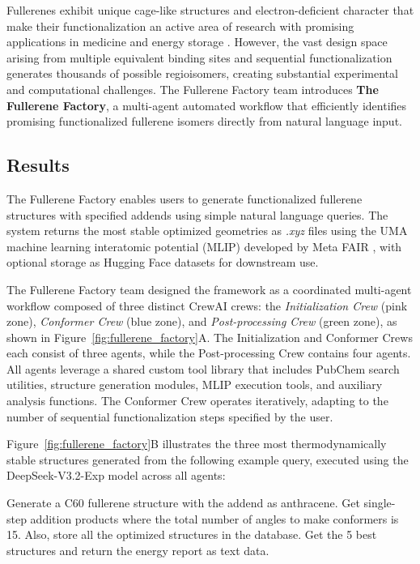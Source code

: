 Fullerenes exhibit unique cage-like structures and electron-deficient character that make their functionalization an active area of research with promising applications in medicine and energy storage \cite{guirado2006structural, zhang2025functionalized}. However, the vast design space arising from multiple equivalent binding sites and sequential functionalization generates thousands of possible regioisomers, creating substantial experimental and computational challenges. The Fullerene Factory team introduces \textbf{The Fullerene Factory}, a multi-agent automated workflow that efficiently identifies promising functionalized fullerene isomers directly from natural language input.

\subsection*{Results}

The Fullerene Factory enables users to generate functionalized fullerene structures with specified addends using simple natural language queries. The system returns the most stable optimized geometries as \textit{.xyz} files using the UMA machine learning interatomic potential (MLIP) developed by Meta FAIR \cite{wood2025umafamilyuniversalmodels}, with optional storage as Hugging Face datasets for downstream use.

The Fullerene Factory team designed the framework as a coordinated multi-agent workflow composed of three distinct CrewAI \cite{moura2023crewai} crews: the \textit{Initialization Crew} (pink zone), \textit{Conformer Crew} (blue zone), and \textit{Post-processing Crew} (green zone), as shown in Figure~\ref{fig:fullerene_factory}A. The Initialization and Conformer Crews each consist of three agents, while the Post-processing Crew contains four agents. All agents leverage a shared custom tool library that includes PubChem search utilities, structure generation modules, MLIP execution tools, and auxiliary analysis functions. The Conformer Crew operates iteratively, adapting to the number of sequential functionalization steps specified by the user.

Figure~\ref{fig:fullerene_factory}B illustrates the three most thermodynamically stable structures generated from the following example query, executed using the DeepSeek-V3.2-Exp model \cite{deepseek} across all agents:

\begin{tcolorbox}[title=\textbf{Example Query}]
Generate a C60 fullerene structure with the addend as anthracene. Get single-step addition products where the total number of angles to make conformers is 15. Also, store all the optimized structures in the database. Get the 5 best structures and return the energy report as text data.
\end{tcolorbox}

